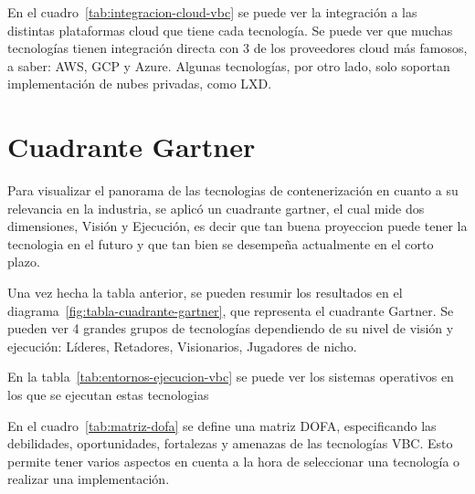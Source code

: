 En el cuadro~\ref{tab:integracion-cloud-vbc} se puede ver la integración a las distintas plataformas cloud que tiene cada tecnología. Se puede ver que muchas tecnologías tienen integración directa con 3 de los proveedores cloud más famosos, a saber: AWS, GCP y Azure. Algunas tecnologías, por otro lado, solo soportan implementación de nubes privadas, como LXD.


\section{Cuadrante Gartner}
Para visualizar el panorama de las tecnologias de contenerización en cuanto a su relevancia en la industria, se aplicó un cuadrante gartner, el cual mide dos dimensiones, Visión y Ejecución, es decir que tan buena proyeccion puede tener la tecnologia en el futuro y que tan bien se desempeña actualmente en el corto plazo.



Una vez hecha la tabla anterior, se pueden resumir los resultados en el diagrama~\ref{fig:tabla-cuadrante-gartner}, que representa el cuadrante Gartner. Se pueden ver 4 grandes grupos de tecnologías dependiendo de su nivel de visión y ejecución: Líderes, Retadores, Visionarios, Jugadores de nicho.


En la tabla~\ref{tab:entornos-ejecucion-vbc} se puede ver los sistemas operativos en los que se ejecutan estas tecnologias 


En el cuadro~\ref{tab:matriz-dofa} se define una matriz DOFA, especificando las debilidades, oportunidades, fortalezas y amenazas de las tecnologías VBC. Esto permite tener varios aspectos en cuenta a la hora de seleccionar una tecnología o realizar una implementación.


